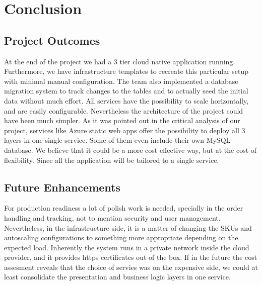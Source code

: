 \documentclass{llncs}
\begin{document}
\section{Conclusion}
\subsection{Project Outcomes}

At the end of the project we had a 3 tier cloud native application running.
Furthermore, we have infrastructure templates to recreate this particular setup with minimal manual configuration.
The team also implemented a database migration system to track changes to the tables and to actually seed the initial data without much effort.
All services have the possibility to scale horizontally, and are easily configurable. Nevertheless the architecture of the project could have been much simpler.
As it was pointed out in the critical analysis of our project, services like Azure static web apps offer the possibility to deploy all 3 layers in one single service.
Some of them even include their own MySQL database. We believe that it could be a more cost effective way, but at the cost of flexibility.
Since all the application will be tailored to a single service.


\subsection{Future Enhancements}
For production readiness a lot of polish work is needed, specially in the order handling and tracking, not to mention security and user management.
Nevertheless, in the infrastructure side, it is a matter of changing the SKUs and autoscaling configurations to something more appropriate depending on the expected load.
Inherently the system runs in a private network inside the cloud provider, and it provides https certificates out of the box.
If in the future the cost assesment reveals that the choice of servies was on the expensive side, we could at least consolidate the presentation and business logic layers in one service.
\end{document}
